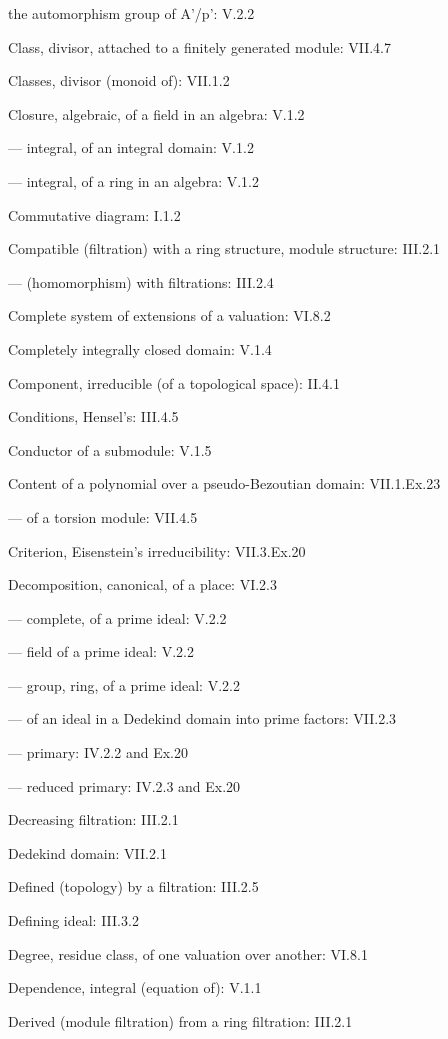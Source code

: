 the automorphism group of A'/p': V.2.2

Class, divisor, attached to a finitely generated module: VII.4.7

Classes, divisor (monoid of): VII.1.2

Closure, algebraic, of a field in an algebra: V.1.2

--- integral, of an integral domain: V.1.2

--- integral, of a ring in an algebra: V.1.2

Commutative diagram: I.1.2

Compatible (filtration) with a ring structure, module structure: III.2.1

--- (homomorphism) with filtrations: III.2.4

Complete system of extensions of a valuation: VI.8.2

Completely integrally closed domain: V.1.4

Component, irreducible (of a topological space): II.4.1

Conditions, Hensel's: III.4.5

Conductor of a submodule: V.1.5

Content of a polynomial over a pseudo-Bezoutian domain: VII.1.Ex.23

--- of a torsion module: VII.4.5

Criterion, Eisenstein's irreducibility: VII.3.Ex.20

Decomposition, canonical, of a place: VI.2.3

--- complete, of a prime ideal: V.2.2

--- field of a prime ideal: V.2.2

--- group, ring, of a prime ideal: V.2.2

--- of an ideal in a Dedekind domain into prime factors: VII.2.3

--- primary: IV.2.2 and Ex.20

--- reduced primary: IV.2.3 and Ex.20

Decreasing filtration: III.2.1

Dedekind domain: VII.2.1

Defined (topology) by a filtration: III.2.5

Defining ideal: III.3.2

Degree, residue class, of one valuation over another: VI.8.1

Dependence, integral (equation of): V.1.1

Derived (module filtration) from a ring filtration: III.2.1

